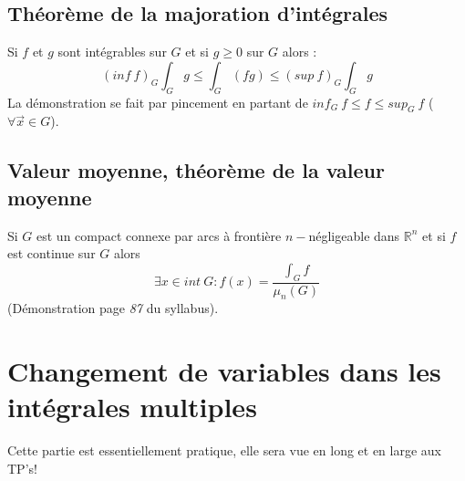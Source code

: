 \documentclass	[11pt, a4paper, openany]{book}
\begin{document}
\subsection{Théorème de la majoration d'intégrales}
Si $f$ et $g$ sont intégrables sur $G$ et si $g \geq 0$ sur $G$ alors : 
$$(inf\ f)_G \int_G g \leq \int_G (fg) \leq (sup\ f)_G \int_G g$$
La démonstration se fait par pincement en partant de $inf_G\ f \leq f \leq sup_G\ f$ ($\forall \vec{x} \in G$).

\subsection{Valeur moyenne, théorème de la valeur moyenne}
Si $G$ est un compact connexe par arcs à frontière $n-$négligeable dans $\mathbb{R}^n$ et si $f$ est continue sur $G$ alors 
$$\exists x \in int\ G : f(x) = \frac{\int_G f}{\mu_n(G)}$$
(Démonstration page \textit{87} du syllabus).


\section{Changement de variables dans les intégrales multiples}
Cette partie est essentiellement pratique, elle sera vue en long et en large aux TP's! 
\end{document}
